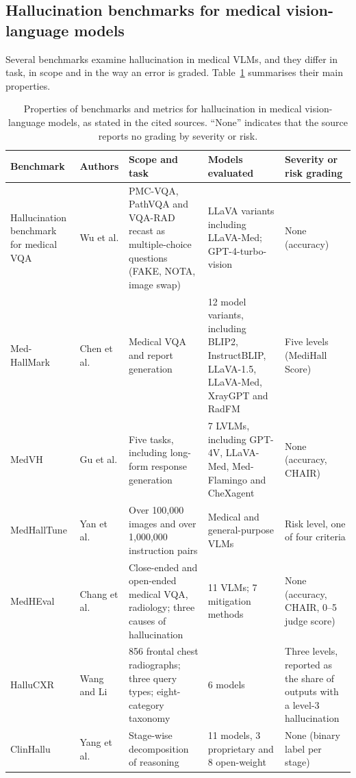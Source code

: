 \documentclass[11pt,a4paper]{article}
\begin{document}
\subsection{Hallucination benchmarks for medical vision-language models}
\label{subsec:rw_bench}

Several benchmarks examine hallucination in medical VLMs, and they differ in task, in scope and in the way an error is graded. Table~\ref{tab:related} summarises their main properties.

\begin{table}[tbp]
\centering
\footnotesize
\caption{Properties of benchmarks and metrics for hallucination in medical vision-language models, as stated in the cited sources. ``None'' indicates that the source reports no grading by severity or risk.}
\label{tab:related}
\begin{tabular}{@{}p{2.2cm}p{2.6cm}p{4.2cm}p{2.9cm}p{2.5cm}@{}}
\toprule
Benchmark & Authors & Scope and task & Models evaluated & Severity or risk grading \\
\midrule
Hallucination benchmark for medical VQA \citep{wu2024halluvqa} & Wu et al. & PMC-VQA, PathVQA and VQA-RAD recast as multiple-choice questions (FAKE, NOTA, image swap) & LLaVA variants including LLaVA-Med; GPT-4-turbo-vision & None (accuracy) \\
Med-HallMark \citep{chen2024medhallmark} & Chen et al. & Medical VQA and report generation & 12 model variants, including BLIP2, InstructBLIP, LLaVA-1.5, LLaVA-Med, XrayGPT and RadFM & Five levels (MediHall Score) \\
MedVH \citep{gu2024medvh} & Gu et al. & Five tasks, including long-form response generation & 7 LVLMs, including GPT-4V, LLaVA-Med, Med-Flamingo and CheXagent & None (accuracy, CHAIR) \\
MedHallTune \citep{yan2025medhalltune} & Yan et al. & Over 100,000 images and over 1,000,000 instruction pairs & Medical and general-purpose VLMs & Risk level, one of four criteria \\
MedHEval \citep{chang2025medheval} & Chang et al. & Close-ended and open-ended medical VQA, radiology; three causes of hallucination & 11 VLMs; 7 mitigation methods & None (accuracy, CHAIR, 0--5 judge score) \\
HalluCXR \citep{wang2026hallucxr} & Wang and Li & 856 frontal chest radiographs; three query types; eight-category taxonomy & 6 models & Three levels, reported as the share of outputs with a level-3 hallucination \\
ClinHallu \citep{yang2026clinhallu} & Yang et al. & Stage-wise decomposition of reasoning & 11 models, 3 proprietary and 8 open-weight & None (binary label per stage) \\

\end{tabular}
\end{table}
\end{document}
